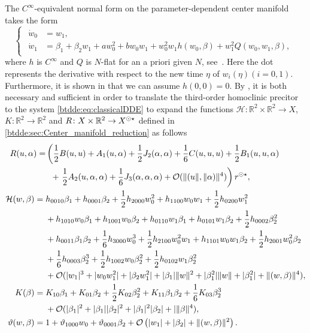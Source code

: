 The $C^\infty$-equivalent normal form on the parameter-dependent
center manifold takes the form
\begin{equation}
\label{btdde:eq:normal_form_orbital}
\begin{cases}
\begin{aligned}
	\dot w_0 & =  w_1, \\
	\dot w_1 & =  \beta_1 + \beta_2 w_1 + aw_0^2 + b w_0 w_1 + w_0^2 w_1
								h(w_0,\beta) + w_1^2 Q(w_0,w_1,\beta),
\end{aligned}
\end{cases}
\end{equation}
where $h$ is $C^\infty$ and $Q$ is $N$-flat for an a priori given $N$,
see~\cite{Broer1991}. Here the dot represents the derivative with respect to
the new time $\eta$ of $w_i(\eta)(i = 0,1)$.  Furthermore, it is shown in
\cite{Bosschaert@Interplay} that we can assume $h(0,0) = 0$. 
By \cite[Proposition 1]{Bosschaert@Interplay}, it is both necessary and sufficient
in order to translate the third-order homoclinic precitor to the system
\cref{btdde:eq:classicalDDE} to expand the functions $\mathcal{H} \colon \mathbb R^2 \times \mathbb R^2 \rightarrow X$, 
$K \colon \mathbb R^2 \rightarrow \mathbb R^2$ and 
$R \colon X \times \mathbb R^2 \rightarrow X^{\odot\star}$ defined in \cref{btdde:sec:Center_manifold_reduction}
as follows
%
\begin{align}
R(u,\alpha) = & \label{btdde:eq:R_expansion_BT}
    \left(\frac{1}{2} B(u,u) + A_1(u,\alpha) + \frac{1}{2} J_2(\alpha,\alpha) + \frac{1}{6} C(u,u,u) 
    + \frac{1}{2} B_1(u,u,\alpha) \right. \\
    &\phantom{\Bigl(}+ \left. \frac{1}{2} A_2(u,\alpha,\alpha) + \frac{1}{6} J_3(\alpha,\alpha,\alpha) 
    + \mathcal O(\|(u\|,\|\alpha)\|^4) \right) r^{\odot\star} , \nonumber \\
\mathcal H(w,\beta) = {}& \label{btdde:eq:h_expansion-BT}
    h_{0010}\beta_1 + h_{0001} \beta_2 
    + \frac12 h_{2000}w_0^2 + h_{1100}w_0w_1 + \frac12 h_{0200}w_1^2 \\
    & + h_{1010}w_0\beta_1 + h_{1001}w_0\beta_2 + h_{0110}w_1\beta_1 
    + h_{0101}w_1\beta_2 + \frac12 h_{0002}\beta_2^2\nonumber \\
    & + h_{0011}\beta_1\beta_2 + \frac16 h_{3000}w_0^3 + \frac12 h_{2100}w_0^2w_1 
    + h_{1101}w_0w_1\beta_2 + \frac12 h_{2001}w_0^2\beta_2\nonumber \\
    & + \frac{1}{6}h_{0003}\beta_2^3 + \frac12 h_{1002}w_0\beta_2^2 
    + \frac12 h_{0102}w_1\beta_2^2 \nonumber \\
    & + \mathcal{O}(|w_1|^3 + |w_0w_1^2| + |\beta_2w_1^2| + |\beta_1|\|w\|^2
    +|\beta_1^2|\|w\| + |\beta_1^2| + \|(w,\beta)\|^4), \nonumber \\
K(\beta) = {}& \label{btdde:eq:K_expansion-BT}
    K_{10}\beta_1 + K_{01}\beta_2 + \frac{1}{2}K_{02}\beta_2^{2} 
	+ K_{11}\beta_1\beta_2 + \frac16 K_{03} \beta_2^3 \\
    &+ \mathcal{O}(|\beta_1|^2 + |\beta_1||\beta_2|^2 + |\beta_1|^2|\beta_2|  
	+ |\|\beta\|^4), \nonumber \\
\vartheta(w,\beta) = {}& \label{btdde:eq:theta_expansion_bt}
    1 + \vartheta_{1000}w_0 + \vartheta_{0001} \beta_2 
    + \mathcal O\left(|w_1| + |\beta_2| + \|(w,\beta)\|^2\right).
\end{align}
